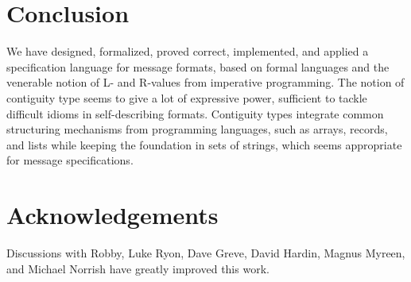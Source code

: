 \documentclass[a4paper,UKenglish,cleveref, autoref, thm-restate]{lipics-v2021}
\begin{document}

\section{Conclusion}

 We have designed, formalized, proved correct, implemented, and applied
a specification language for message formats, based on formal
languages and the venerable notion of L- and R-values from imperative
programming. The notion of contiguity type seems to give a lot of
expressive power, sufficient to tackle difficult idioms in
self-describing formats. Contiguity types integrate common structuring
mechanisms from programming languages, such as arrays, records, and
lists while keeping the foundation in sets of strings, which seems
appropriate for message specifications.

\section*{Acknowledgements}

Discussions with Robby, Luke Ryon, Dave Greve, David Hardin, Magnus
Myreen, and Michael Norrish have greatly improved this work.

%

\end{document}
